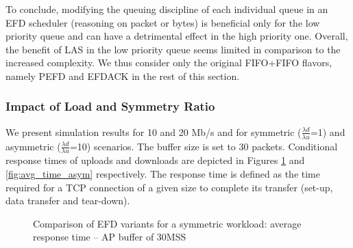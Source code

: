 \documentclass[preprint,12pt]{elsarticle}
\begin{document}
To conclude, modifying the queuing discipline of each individual queue in an EFD scheduler (reasoning on packet or bytes) is beneficial only for the low priority queue and can have a detrimental effect in the high priority one. Overall, the benefit of LAS in the low priority queue seems limited in comparison to the increased complexity. We thus consider only the original FIFO+FIFO flavors, namely PEFD and EFDACK in the rest of this section.

\subsubsection{Impact of Load and Symmetry Ratio} \label{section:response_time}

We present simulation results for 10 and 20 Mb/s and for symmetric ($\frac{\lambda{d}}{\lambda{u}}$=1) and asymmetric ($\frac{\lambda{d}}{\lambda{u}}$=10) scenarios. The buffer size is set to 30 packets. Conditional response times of uploads and downloads are depicted in Figures \ref{fig:avg_time_sym} and \ref{fig:avg_time_asym} respectively. The response time is defined as the time required for a TCP connection of a given size to complete its transfer (set-up, data transfer and tear-down). 


\begin{figure}[ht!]
  \centering
  \caption{Comparison of EFD variants for a symmetric workload: average response time --  AP buffer of 30MSS}
  \label{fig:avg_time_sym}
\end{figure}
\end{document}
